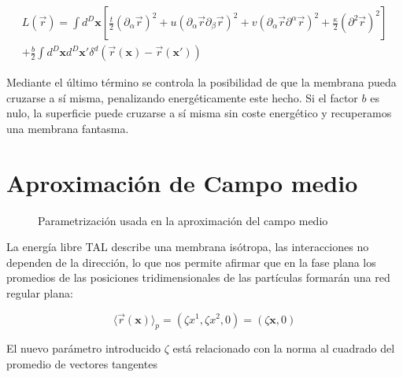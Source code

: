 \begin{multline}
L(\vec{r})=\int d^D\mathbf{x}
\left[
\frac{t}{2}(\partial_{\alpha}\vec{r})^2+
u(\partial_{\alpha}\vec{r}\partial_{\beta}\vec{r})^2+
v(\partial_{\alpha}\vec{r}\partial^{\alpha}\vec{r})^2+
\frac{\kappa}{2}(\partial^2\vec{r})^2
\right]\\
+\frac{b}{2}\int d^D\mathbf{x} d^D\mathbf{x'}
\delta^{d}(\vec{r}(\mathbf{x})-\vec{r}(\mathbf{x'}))
\end{multline}

Mediante el último término se controla la posibilidad de que la membrana pueda
cruzarse a sí misma, penalizando energéticamente este hecho. Si el factor $b$
es nulo, la superficie puede cruzarse a sí misma sin coste energético y
recuperamos una membrana fantasma.

\section{Aproximación de Campo medio}



\begin{figure}[h]
\centering
 \resizebox{\columnwidth}{!}{}
\caption{Parametrización usada en la aproximación del campo medio}
\end{figure}

La energía libre TAL describe una membrana isótropa, las interacciones no
dependen de la dirección, lo que nos permite afirmar que en la fase
plana los promedios de las posiciones tridimensionales de las partículas
formarán una red regular plana:  

\begin{equation}
 \langle\vec{r}(\mathbf{x})\rangle_{p}=(\zeta x^1,\zeta x^2,0)=(\zeta \mathbf{x},0) 
\end{equation}

El nuevo parámetro introducido $\zeta$ está relacionado con la norma al
cuadrado del promedio de  vectores tangentes

